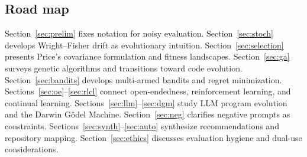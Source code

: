 \subsection{Road map}
Section~\ref{sec:prelim} fixes notation for noisy evaluation.
Section~\ref{sec:stoch} develops Wright--Fisher drift as evolutionary intuition.
Section~\ref{sec:selection} presents Price's covariance formulation and fitness landscapes.
Section~\ref{sec:ga} surveys genetic algorithms and transitions toward code evolution.
Section~\ref{sec:bandits} develops multi-armed bandits and regret minimization.
Sections~\ref{sec:oe}--\ref{sec:rlcl} connect open-endedness, reinforcement learning, and continual learning.
Sections~\ref{sec:llm}--\ref{sec:dgm} study LLM program evolution and the Darwin G\"odel Machine.
Section~\ref{sec:neg} clarifies negative prompts as constraints.
Sections~\ref{sec:synth}--\ref{sec:auto} synthesize recommendations and repository mapping.
Section~\ref{sec:ethics} discusses evaluation hygiene and dual-use considerations.

